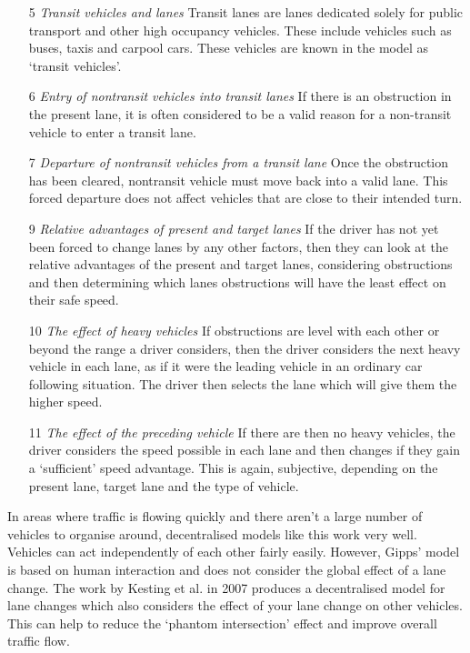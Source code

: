 \begin{enumerate}
\item[5] \textit{Transit vehicles and lanes}
Transit lanes are lanes dedicated solely for public transport and other high occupancy vehicles. These include vehicles such as buses, taxis and carpool cars. These vehicles are known in the model as `transit vehicles'.
\item[6] \textit{Entry of nontransit vehicles into transit lanes}
If there is an obstruction in the present lane, it is often considered to be a valid reason for a non-transit vehicle to enter a transit lane. 
\item[7] \textit{Departure of nontransit vehicles from a transit lane}
Once the obstruction has been cleared, nontransit vehicle must move back into a valid lane. This forced departure does not affect vehicles that are close to their intended turn.
\item[9] \textit{Relative advantages of present and target lanes}
If the driver has not yet been forced to change lanes by any other factors, then they can look at the relative advantages of the present and target lanes, considering obstructions and then determining which lanes obstructions will have the least effect on their safe speed.
\item[10] \textit{The effect of heavy vehicles} 
If obstructions are level with each other or beyond the range a driver considers, then the driver considers the next heavy vehicle in each lane, as if it were the leading vehicle in an ordinary car following situation. The driver then selects the lane which will give them the higher speed.
\item[11] \textit{The effect of the preceding vehicle}
If there are then no heavy vehicles, the driver considers the speed possible in each lane and then changes if they gain a `sufficient' speed advantage. This is again, subjective, depending on the present lane, target lane and the type of vehicle.
\end{enumerate}

In areas where traffic is flowing quickly and there aren't a large number of vehicles to organise around, decentralised models like this work very well. Vehicles can act independently of each other fairly easily. However, Gipps' model is based on human interaction and does not consider the global effect of a lane change. The work by Kesting et al. in 2007 \citep{Kesting2007} produces a decentralised model for lane changes which also considers the effect of your lane change on other vehicles. This can help to reduce the `phantom intersection' effect and improve overall traffic flow.

